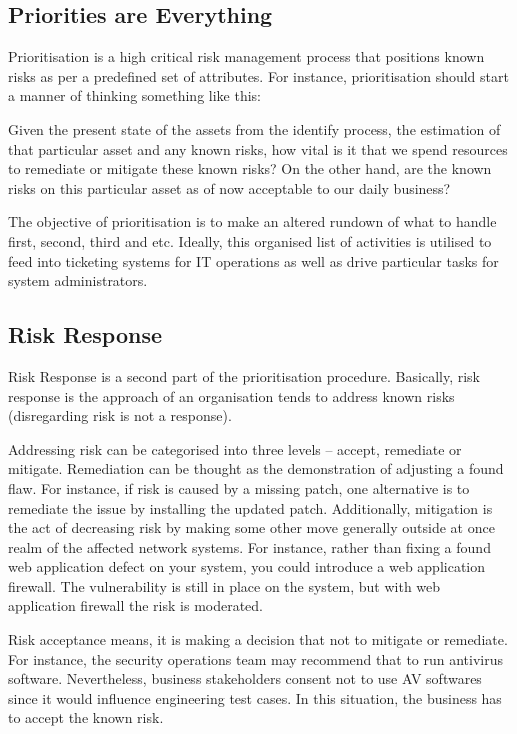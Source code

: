 \subsection*{Priorities are Everything}
Prioritisation is a high critical risk management process that positions known risks as per a predefined set of attributes. For instance, prioritisation should start a manner of thinking something like this:

Given the present state of the assets from the identify process,  the estimation of that particular asset and any known risks, how vital is it that we spend resources to remediate or mitigate these known risks? On the other hand, are the known risks on this particular asset as of now acceptable to our daily business?

The objective of prioritisation is to make an altered rundown of what to handle first, second, third and etc. Ideally, this organised list of activities is utilised to feed into ticketing systems for IT operations as well as drive particular tasks for system administrators.

\subsection*{Risk Response}
Risk Response is a second part of the prioritisation procedure. Basically, risk response is the approach of an organisation tends to address known risks (disregarding risk is not a response).

Addressing risk can be categorised into three levels -- accept, remediate or mitigate. Remediation can be thought as the demonstration of adjusting a found flaw. For instance, if risk is caused by a missing patch, one alternative is to remediate the issue by installing the updated patch. Additionally, mitigation is the act of decreasing risk by making some other move generally outside at once realm of the affected network systems. For instance, rather than fixing a found web application defect on your system, you could introduce a web application firewall. The vulnerability is still in place on the system, but with web application firewall the risk is moderated. 

Risk acceptance means, it is making a decision that not to mitigate or remediate. For instance, the security operations team may recommend that to run antivirus software. Nevertheless, business stakeholders consent not to use AV softwares since it would influence engineering test cases. In this situation, the business has to accept the known risk. 


